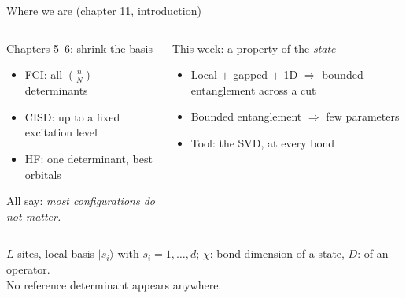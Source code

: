 \documentclass[aspectratio=169,10pt]{beamer}
\newcommand{\ket}[1]{\vert #1\rangle}
\begin{document}
\begin{frame}{Where we are (chapter 11, introduction)}
  \begin{columns}[T]
    \begin{block}{Chapters 5--6: shrink the basis}
      \begin{itemize}
        \item FCI: all $\binom nN$ determinants
        \item CISD: up to a fixed excitation level
        \item HF: one determinant, best orbitals
      \end{itemize}
      \vspace{0.4em}
      All say: \emph{most configurations do not matter.}
    \end{block}
    \begin{block}{This week: a property of the \emph{state}}
      \begin{itemize}
        \item Local $+$ gapped $+$ 1D $\Rightarrow$ bounded entanglement across a cut
        \item Bounded entanglement $\Rightarrow$ few parameters
        \item Tool: the SVD, at \alert{every bond}
      \end{itemize}
    \end{block}
  \end{columns}
  \vspace{1em}
  \centering
  $L$ sites, local basis $\ket{s_i}$ with $s_i=1,\dots,d$; \quad $\chi$: bond dimension of a state, $D$: of an operator.\\[0.4em]
  \alert{No reference determinant appears anywhere.}
\end{frame}
\end{document}
